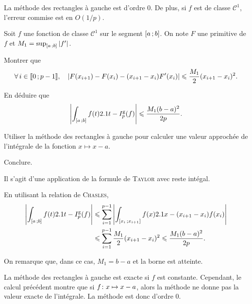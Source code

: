 \begin{prop}
La méthode des rectangles à gauche est d'ordre $0$. De plus, si $f$ est de classe $\mathscr{C}^1$, l'erreur commise est en $O(1/p)$.
\end{prop}

\begin{exercice}
Soit $f$ une fonction de classe $\mathscr{C}^1$ sur le segment $\interff{a}{b}$. On note $F$ une primitive de $f$ et $M_1 = \sup_{\interff{a}{b}} \module{f'}$.
\begin{questions}
\item Montrer que
\[
\forall i \in \interent{0}{p-1},\quad 
\module{F(x_{i+1}) - F(x_i) - (x_{i+1} - x_i) F'(x_i)} \leqslant \frac{M_1}{2} (x_{i+1}-x_i)^2.
\]

\item En déduire que
\[
\module{\int_{\interff{a}{b}} f(t) \d t - I_p^\mathrm{g}(f)}
\leqslant \frac{M_1 (b-a)^2}{2 p}.
\]

\item Utiliser la méthode des rectangles à gauche pour calculer une valeur approchée de l'intégrale de la fonction $x \mapsto x - a$.

\item Conclure.
\end{questions}
\end{exercice}

\begin{elemsolution}

\begin{reponses}
\item Il s'agit d'une application de la formule de \textsc{Taylor} avec reste intégal.

\item En utilisant la relation de \textsc{Chasles},
\begin{align*}
\module{\int_{\interff{a}{b}} f(t) \d t - I_p^\mathrm{g}(f)}
&\leqslant \sum_{i=1}^{p-1} \module{\int_{\interff{x_i}{x_{i+1}}} f(x) \d x - (x_{i+1} - x_i) f(x_i)}\\
&\leqslant \sum_{i=1}^{p-1} \frac{M_1}{2} (x_{i+1} - x_i)^2
\leqslant \frac{M_1 (b-a)^2}{2 p}.
\end{align*}

\item On remarque que, dans ce cas, $M_1 = b - a$ et la borne est atteinte.

\item La méthode des rectangles à gauche est exacte si $f$ est constante. Cependant, le calcul précédent montre que si $\fonctionligne[f]{x}{x - a}$, alors la méthode ne donne pas la valeur exacte de l'intégrale. La méthode est donc d'ordre $0$.
\end{reponses}
\end{elemsolution}

